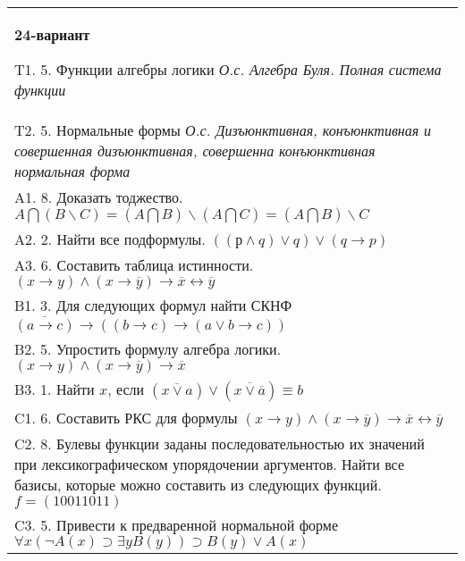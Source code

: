 \documentclass{article}
\begin{document}
\begin{tabular}{m{17cm}}
\textbf{24-вариант}
\newline

T1. 5. Функции алгебры логики \emph{О.с. Алгебра Буля. Полная система функции} \\
T2. 5. Нормальные формы \emph{О.с. Дизъюнктивная, конъюнктивная и совершенная дизъюнктивная, совершенна конъюнктивная нормальная форма} \\
A1. 8. Доказать тоджество. \(A\bigcap(B\backslash C) = (A\bigcap B)\backslash(A\bigcap C) = (A\bigcap B)\backslash C\) \\
A2. 2. Найти все подформулы. \(\left( (р \land q) \vee q \right) \vee (q \rightarrow p)\) \\
A3. 6. Составить таблица истинности. \((x \rightarrow y) \land (x \rightarrow \overline{y}) \rightarrow \overline{x} \leftrightarrow \overline{y}\) \\
B1. 3. Для следующих формул найти СКНФ \(\overline{(a \rightarrow c)} \rightarrow \left( (b \rightarrow c) \rightarrow (a \vee b \rightarrow c) \right)\) \\
B2. 5. Упростить формулу алгебра логики. \((x \rightarrow y) \land (x \rightarrow \overline{y}) \rightarrow \overline{x}\) \\
B3. 1. Найти \(x\), если \(\left( \overline{x \vee a} \right) \vee \left( \overline{x \vee \overline{a}} \right) \equiv b\) \\
C1. 6. Составить РКС для формулы \((x \rightarrow y) \land (x \rightarrow \overline{y}) \rightarrow \overline{x} \leftrightarrow \overline{y}\) \\
C2. 8. Булевы функции заданы последовательностью их значений при лексикографическом упорядочении аргументов. Найти все базисы, которые можно составить из следующих функций. \(f = (10011011)\) \\
C3. 5. Привести к предваренной нормальной форме \(\forall x(\neg A(x) \supset \exists yB(y)) \supset B(y) \vee A(x)\) \\

\end{tabular}
\vspace{1cm}
\end{document}

